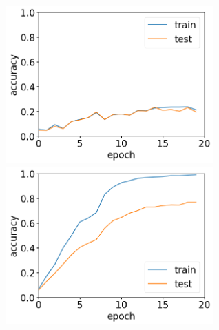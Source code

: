 \documentclass[11pt,a4paper,uplatex]{ujarticle}
\begin{document}
  \begin{figure}[tbp]
    \begin{minipage}[b]{0.5\textwidth}
      \centering
      \includegraphics[keepaspectratio, width=80mm]{Images/python/acc_202402051931.png}
    \end{minipage}
    \begin{minipage}[b]{0.5\textwidth}
      \centering
      \includegraphics[keepaspectratio, width=80mm]{Images/python/acc_202402052150.png}
    \end{minipage}
  \end{figure}
\end{document}
